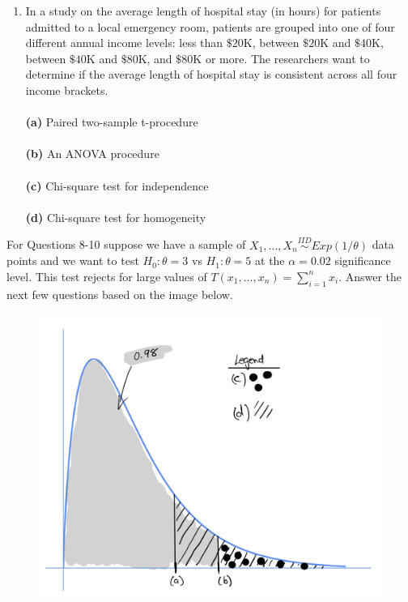 \documentclass[12pt]{article}
\begin{document}
\begin{enumerate}[leftmargin=\labelsep]
\item In a study on the average length of hospital stay (in hours) for patients admitted to a local emergency room, patients are grouped into one of four different annual income levels: less than $\$20$K, between $\$20$K and $\$40$K, between $\$40$K and $\$80$K, and $\$80$K or more. The researchers want to determine if the average length of hospital stay is consistent across all four income brackets.\\ \vspace{1mm}\\
{\bf (a)} \hspace{2mm} Paired two-sample t-procedure\\ \vspace{1mm}\\
{\bf (b)} \hspace{2mm} An ANOVA procedure\\   \vspace{1mm}\\
{\bf (c)} \hspace{2mm} Chi-square test for independence\\  \vspace{1mm}\\
{\bf (d)} \hspace{2mm} Chi-square test for homogeneity\\
\end{enumerate}


\noindent For Questions 8-10 suppose we have a sample of $X_1,\dots,X_n \stackrel{IID}{\sim} Exp(1/\theta)$ data points and we want to test $H_0: \theta=3$ vs $H_1: \theta=5$ at the $\alpha=0.02$ significance level. This test rejects for large values of $T(x_1, \dots, x_n) = \sum_{i=1}^{n}x_i$. Answer the next few questions based on the image below. 


\begin{figure}[h]
\centering
\includegraphics[width=0.7\linewidth]{Stat 61 final.png}
\end{figure}	
\end{document}
